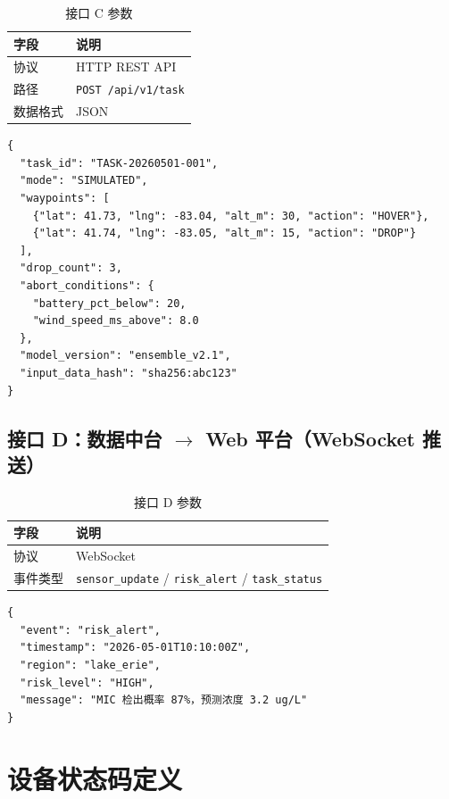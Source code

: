 \documentclass[12pt,a4paper,openany]{ctexrep}
\begin{document}
\begin{table}[htbp]
\centering
\caption{接口 C 参数}
\begin{tabular}{ll}
\toprule
\textbf{字段} & \textbf{说明} \\
\midrule
协议 & HTTP REST API \\
路径 & \texttt{POST /api/v1/task} \\
数据格式 & JSON \\
\bottomrule
\end{tabular}
\end{table}

\begin{lstlisting}[language={},title={接口 C 数据示例}]
{
  "task_id": "TASK-20260501-001",
  "mode": "SIMULATED",
  "waypoints": [
    {"lat": 41.73, "lng": -83.04, "alt_m": 30, "action": "HOVER"},
    {"lat": 41.74, "lng": -83.05, "alt_m": 15, "action": "DROP"}
  ],
  "drop_count": 3,
  "abort_conditions": {
    "battery_pct_below": 20,
    "wind_speed_ms_above": 8.0
  },
  "model_version": "ensemble_v2.1",
  "input_data_hash": "sha256:abc123"
}
\end{lstlisting}

\subsection{接口 D：数据中台 $\rightarrow$ Web 平台（WebSocket 推送）}

\begin{table}[htbp]
\centering
\caption{接口 D 参数}
\begin{tabular}{ll}
\toprule
\textbf{字段} & \textbf{说明} \\
\midrule
协议 & WebSocket \\
事件类型 & \texttt{sensor\_update} / \texttt{risk\_alert} / \texttt{task\_status} \\
\bottomrule
\end{tabular}
\end{table}

\begin{lstlisting}[language={},title={接口 D 数据示例}]
{
  "event": "risk_alert",
  "timestamp": "2026-05-01T10:10:00Z",
  "region": "lake_erie",
  "risk_level": "HIGH",
  "message": "MIC 检出概率 87%，预测浓度 3.2 ug/L"
}
\end{lstlisting}

\section{设备状态码定义}
\end{document}
